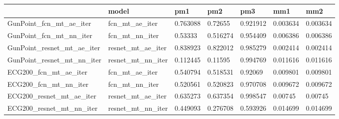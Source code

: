 \begin{tabular}{lllllll}
\toprule
{} &              model &       pm1 &       pm2 &       pm3 &       mm1 &       mm2 \\
\midrule
GunPoint\_fcn\_mt\_ae\_iter    &     fcn\_mt\_ae\_iter &  0.763088 &   0.72655 &  0.921912 &  0.003634 &  0.003634 \\
GunPoint\_fcn\_mt\_nn\_iter    &     fcn\_mt\_nn\_iter &   0.53333 &  0.516274 &  0.954409 &  0.006386 &  0.006386 \\
GunPoint\_resnet\_mt\_ae\_iter &  resnet\_mt\_ae\_iter &  0.838923 &  0.822012 &  0.985279 &  0.002414 &  0.002414 \\
GunPoint\_resnet\_mt\_nn\_iter &  resnet\_mt\_nn\_iter &  0.112445 &   0.11595 &  0.994769 &  0.011616 &  0.011616 \\
ECG200\_fcn\_mt\_ae\_iter      &     fcn\_mt\_ae\_iter &  0.540794 &  0.518531 &   0.92069 &  0.009801 &  0.009801 \\
ECG200\_fcn\_mt\_nn\_iter      &     fcn\_mt\_nn\_iter &  0.520561 &  0.520823 &  0.970708 &  0.009672 &  0.009672 \\
ECG200\_resnet\_mt\_ae\_iter   &  resnet\_mt\_ae\_iter &  0.635273 &  0.637354 &  0.998547 &   0.00745 &   0.00745 \\
ECG200\_resnet\_mt\_nn\_iter   &  resnet\_mt\_nn\_iter &  0.449093 &  0.276708 &  0.593926 &  0.014699 &  0.014699 \\
\bottomrule
\end{tabular}
